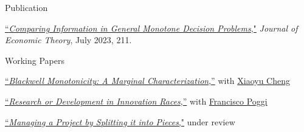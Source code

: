 \begin{rSection}{Publication}
	
	\begin{etaremune}
		\item \href{https://yonggyun-yg-kim.github.io/files/Research%20papers/GMDP_JET.pdf}{``\textit{Comparing Information in General Monotone Decision Problems},"} 
		\textit{Journal of Economic Theory}, July 2023, 211. 
		
	\end{etaremune}
	
	
	
\end{rSection}

\begin{rSection}{Working Papers}
	
	\begin{etaremune}
		
		\item
		 \href{https://yonggyun-yg-kim.github.io/files/Research%20papers/BMIC.pdf}{``\textit{Blackwell Monotonicity: A Marginal Characterization},''} with \href{https://xiaoyu-cheng.com/}{Xiaoyu Cheng}
		
		\item \href{https://yonggyun-yg-kim.github.io/files/Research%20papers/RDIR.pdf}{``\textit{Research or Development in Innovation Races},''}   with \href{https://www.franciscopoggi.com/}{Francisco Poggi}
		
		\item \href{https://yonggyun-yg-kim.github.io/files/Research%20papers/Managing%20a%20Project%20by%20Splitting%20it%20into%20Pieces.pdf}{``\textit{Managing a Project by Splitting it into Pieces},"} under review

	\end{etaremune}
	
	
\end{rSection}


